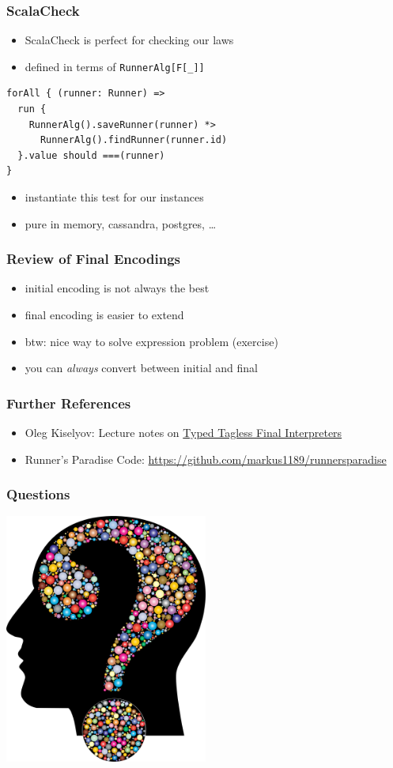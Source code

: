 \documentclass{beamer}
\begin{document}
\begin{frame}[fragile]
  \frametitle{ScalaCheck}
  \begin{itemize}
  \item ScalaCheck is perfect for checking our laws
  \item defined in terms of \texttt{RunnerAlg[F[\_]]}
  \end{itemize}

\begin{verbatim}
forAll { (runner: Runner) =>
  run {
    RunnerAlg().saveRunner(runner) *>
      RunnerAlg().findRunner(runner.id)
  }.value should ===(runner)
}
\end{verbatim}
  \begin{itemize}
  \item instantiate this test for our instances
  \item pure in memory, cassandra, postgres, \dots{}
  \end{itemize}
\end{frame}

\begin{frame}
  \frametitle{Review of Final Encodings}
  \begin{itemize}
  \item initial encoding is not always the best
  \item final encoding is easier to extend
  \item btw: nice way to solve expression problem (exercise)
  \item you can \textit{always} convert between initial and final
  \end{itemize}
\end{frame}

\begin{frame}
  \frametitle{Further References}
  \begin{itemize}
  \item Oleg Kiselyov: Lecture notes on
    \href{http://okmij.org/ftp/tagless-final/course/lecture.pdf}{Typed
      Tagless Final Interpreters}
  \item Runner's Paradise Code: \url{https://github.com/markus1189/runnersparadise}
  \end{itemize}
\end{frame}

\begin{frame}
  \frametitle{Questions}
  \begin{center}
    \includegraphics[width=0.5\textwidth]{pics/questions.png}
  \end{center}
\end{frame}
\end{document}
